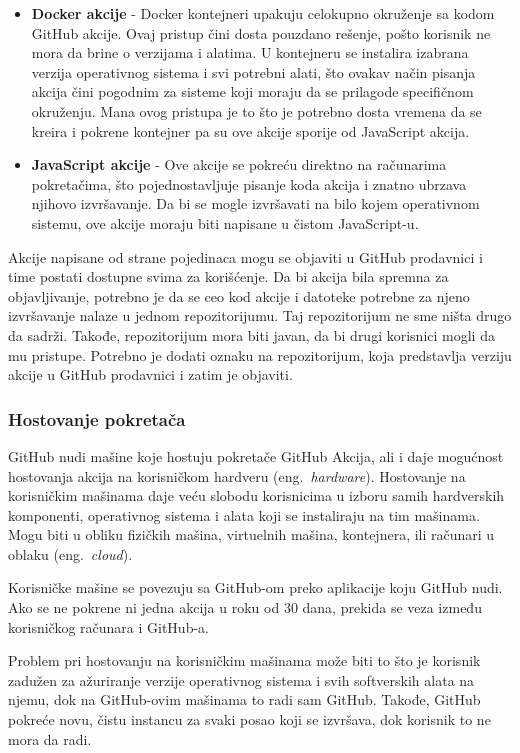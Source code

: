 \documentclass[12pt]{report}
\begin{document}
\begin{itemize}
    \item\textbf{Docker akcije} - Docker kontejneri upakuju celokupno okruženje sa kodom GitHub akcije. Ovaj pristup čini dosta pouzdano rešenje, pošto korisnik ne mora da brine o verzijama i alatima. U kontejneru se instalira izabrana verzija operativnog sistema i svi potrebni alati, što ovakav način pisanja akcija čini pogodnim za sisteme koji moraju da se prilagode specifičnom okruženju. Mana ovog pristupa je to što je potrebno dosta vremena da se kreira i pokrene kontejner pa su ove akcije sporije od JavaScript akcija.
    \item\textbf{JavaScript akcije} - Ove akcije se pokreću direktno na računarima pokretačima, što pojednostavljuje pisanje koda akcija i znatno ubrzava njihovo izvršavanje. Da bi se mogle izvršavati na bilo kojem operativnom sistemu, ove akcije moraju biti napisane u čistom JavaScript-u.
\end{itemize}

Akcije napisane od strane pojedinaca mogu se objaviti u GitHub prodavnici i time postati dostupne svima za korišćenje. Da bi akcija bila spremna za objavljivanje, potrebno je da se ceo kod akcije i datoteke potrebne za njeno izvršavanje nalaze u jednom repozitorijumu. Taj repozitorijum ne sme ništa drugo da sadrži. Takođe, repozitorijum mora biti javan, da bi drugi korisnici mogli da mu pristupe. Potrebno je dodati oznaku na repozitorijum, koja predstavlja verziju akcije u GitHub prodavnici i zatim je objaviti.

\subsubsection{Hostovanje pokretača}
GitHub nudi mašine koje hostuju pokretače GitHub Akcija, ali i daje mogućnost hostovanja akcija na korisničkom hardveru (eng.\ \textit{hardware}). Hostovanje na korisničkim mašinama daje veću slobodu korisnicima u izboru samih hardverskih komponenti, operativnog sistema i alata koji se instaliraju na tim mašinama. Mogu biti u obliku fizičkih mašina, virtuelnih mašina, kontejnera, ili računari u oblaku (eng.\ \textit{cloud}).

Korisničke mašine se povezuju sa GitHub-om preko aplikacije koju GitHub nudi. Ako se ne pokrene ni jedna akcija u roku od 30 dana, prekida se veza između korisničkog računara i GitHub-a.

Problem pri hostovanju na korisničkim mašinama može biti to što je korisnik zadužen za ažuriranje verzije operativnog sistema i svih softverskih alata na njemu, dok na GitHub-ovim mašinama to radi sam GitHub. Takođe, GitHub pokreće novu, čistu instancu za svaki posao koji se izvršava, dok korisnik to ne mora da radi.
\end{document}
